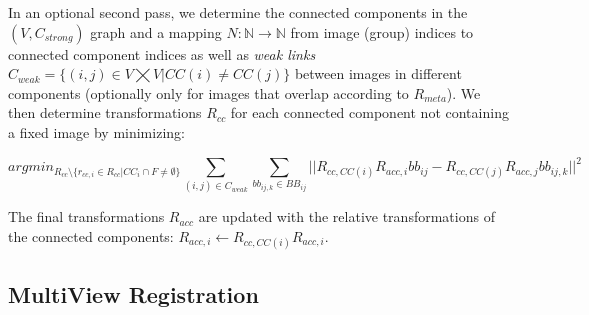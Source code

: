 In an optional second pass, we determine the connected components in the $(V, C_{strong} )$ graph and a mapping $N: \mathbb{N} \to \mathbb{N}$ from image (group) indices to  connected component indices as well as \emph{weak links} $C_{weak} = \{(i,j) \in V \bigtimes V | CC(i) \neq CC(j) \}$ between images in different components (optionally only for images that overlap according to $R_{meta}$). We then determine transformations $R_{cc}$ for each connected component not containing a fixed image by minimizing:

\begin{equation}
\label{eq:eq3}
argmin_{R_{cc} \setminus \{ r_{cc,i} \in R_{cc} | CC_i \cap F \neq \emptyset \}} \sum_{(i,j) \in C_{weak}} \sum_{bb_{ij,k} \in BB_{ij}} || R_{cc,CC(i)} R_{acc,i} bb_{ij} - R_{cc,CC(j)} R_{acc,j} bb_{ij,k} ||^2 
\end{equation}

The final transformations $R_{acc}$ are updated with the relative transformations of the connected components: $R_{acc,i} \leftarrow R_{cc, CC(i)} R_{acc,i}$.

\subsection{MultiView Registration}





\pagebreak


